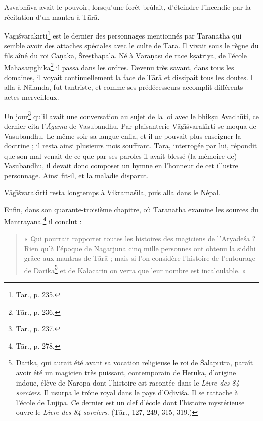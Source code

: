 \documentclass[a4paper, 11pt, oneside, french, landscape, twocolumn]{article}
\begin{document}
Asvabh\={a}va avait le pouvoir, lorsqu'une forêt brûlait, d'éteindre l'incendie par la récitation d'un mantra à T\={a}r\={a}.

V\={a}g\={\i}\'{s}varak\={\i}rti\footnote{T\={a}r., p. 235.} est le dernier des personnages mentionnés par T\={a}ran\={a}tha qui semble avoir des attaches spéciales avec le culte de T\={a}r\={a}. Il vivait sous le règne du fils aîné du roi Ca\d{n}aka, \'{S}re\d{s}\d{t}hap\={a}la. Né à V\={a}ra\d{n}\={a}s\={\i} de race k\d{s}atriya, de l'école Mah\={a}s\={a}\d{m}ghika\footnote{T\={a}r., p. 236.} il passa dans les ordres. Devenu très savant, dans tous les domaines, il voyait continuellement la face de T\={a}r\={a} et dissipait tous les doutes. Il alla à N\={a}landa, fut tantriste, et comme ses prédécesseurs accomplit différents actes merveilleux.

Un jour\footnote{T\={a}r., p. 237.} qu'il avait une conversation au sujet de la loi avec le bhik\d{s}u Avadh\={u}ti, ce dernier cita l'\emph{\={A}gama} de Vasubandhu. Par plaisanterie V\={a}g\={\i}\'{s}varak\={\i}rti se moqua de Vasubandhu. Le même soir sa langue enfla, et il ne pouvait plus enseigner la doctrine ; il resta ainsi plusieurs mois souffrant. T\={a}r\={a}, interrogée par lui, répondit que son mal venait de ce que par ses paroles il avait blessé (la mémoire de) Vasubandhu, il devait donc composer un hymne en l'honneur de cet illustre personnage. Ainsi fit-il, et la maladie disparut.

V\={a}g\={\i}\'{s}varak\={\i}rti resta longtemps à Vikrama\'{s}\={\i}la, puis alla dans le Népal.

Enfin, dans son quarante-troisième chapitre, où T\={a}ran\={a}tha examine les sources du Mantray\={a}na,\footnote{T\={a}r., p. 278.} il conclut :
\begin{quotation}\footnotesize
« Qui pourrait rapporter toutes les histoires des magiciens de l'\={A}ryade\'{s}a ? Rien qu'à l'époque de N\={a}g\={a}rjuna cinq mille personnes ont obtenu la siddhi grâce aux mantras de T\={a}r\={a} ; mais si l'on considère l'histoire de l'entourage de D\={a}rika\footnote{D\={a}rika, qui aurait été avant sa vocation religieuse le roi de \'{S}alaputra, paraît avoir été un magicien très puissant, contemporain de Heruka, d'origine indoue, élève de N\={a}ropa dont l'histoire est racontée dans le \emph{Livre des 84 sorciers}. Il usurpa le trône royal dans le pays d'O\d{d}ivi\'{s}a. Il se rattache à l'école de L\={u}jipa. Ce dernier est un clef d'école dont l'histoire mystérieuse ouvre le \emph{Livre des 84 sorciers}. (T\={a}r., 127, 249, 315, 319.)} et de K\={a}lac\={a}rin on verra que leur nombre est incalculable. »
\end{quotation}
\end{document}
